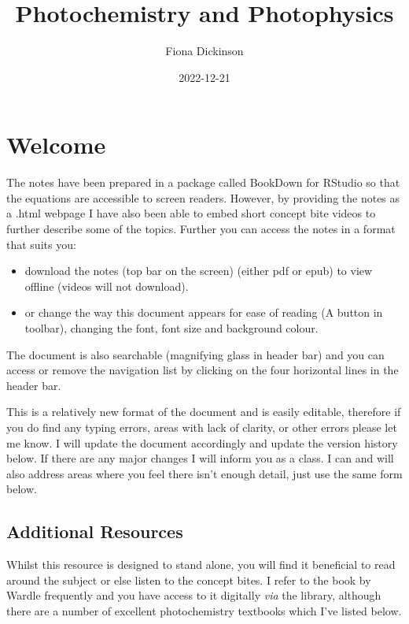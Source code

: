 \documentclass[
]{book}
\title{Photochemistry and Photophysics}
\author{Fiona Dickinson}
\date{2022-12-21}
\providecommand{\tightlist}{%
  \setlength{\itemsep}{0pt}\setlength{\parskip}{0pt}}
\begin{document}
\maketitle

{
\setcounter{tocdepth}{1}
\tableofcontents
}
\hypertarget{welcome}{%
\chapter*{Welcome}\label{welcome}}

The notes have been prepared in a package called BookDown for RStudio so that the equations are accessible to screen readers. However, by providing the notes as a .html webpage I have also been able to embed short concept bite videos to further describe some of the topics. Further you can access the notes in a format that suits you:

\begin{itemize}
\tightlist
\item
  download the notes (top bar on the screen) (either pdf or epub) to view offline (videos will not download).
\item
  or change the way this document appears for ease of reading (A button in toolbar), changing the font, font size and background colour.
\end{itemize}

The document is also searchable (magnifying glass in header bar) and you can access or remove the navigation list by clicking on the four horizontal lines in the header bar.

This is a relatively new format of the document and is easily editable, therefore if you do find any typing errors, areas with lack of clarity, or other errors please let me know. I will update the document accordingly and update the version history below. If there are any major changes I will inform you as a class. I can and will also address areas where you feel there isn't enough detail, just use the same form below.

\hypertarget{sec:AddnRes}{%
\section{Additional Resources}\label{sec:AddnRes}}

Whilst this resource is designed to stand alone, you will find it beneficial to read around the subject or else listen to the concept bites. I refer to the book by Wardle frequently and you have access to it digitally \emph{via} the library, although there are a number of excellent photochemistry textbooks which I've listed below.
\end{document}
